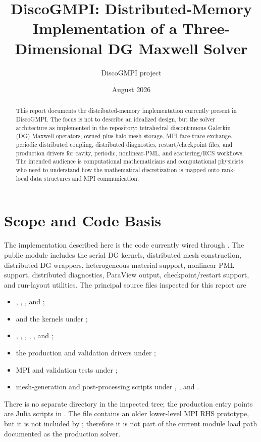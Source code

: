 \documentclass[11pt]{article}
\title{DiscoGMPI: Distributed-Memory Implementation of a Three-Dimensional DG Maxwell Solver}
\author{DiscoGMPI project}
\date{August 2026}
\begin{document}
\maketitle

\begin{abstract}
This report documents the distributed-memory implementation currently present
in DiscoGMPI.  The focus is not to describe an idealized design, but the
solver architecture as implemented in the repository: tetrahedral
discontinuous Galerkin (DG) Maxwell operators, owned-plus-halo mesh storage,
MPI face-trace exchange, periodic distributed coupling, distributed
diagnostics, restart/checkpoint files, and production drivers for cavity,
periodic, nonlinear-PML, and scattering/RCS workflows.  The intended audience
is computational mathematicians and computational physicists who need to
understand how the mathematical discretization is mapped onto rank-local data
structures and MPI communication.
\end{abstract}

\tableofcontents

\section{Scope and Code Basis}

The implementation described here is the code currently wired through
.  The public module includes the serial DG kernels,
distributed mesh construction, distributed DG wrappers, heterogeneous
material support, nonlinear PML support, distributed diagnostics, ParaView
output, checkpoint/restart support, and run-layout utilities.  The principal
source files inspected for this report are
\begin{itemize}
  \item {},
        ,
        ,
        and ;
  \item {} and the kernels under
        ;
  \item {}, ,
        , ,
        , and ;
  \item the production and validation drivers under ;
  \item MPI and validation tests under ;
  \item mesh-generation and post-processing scripts under
        , , and
        .
\end{itemize}
There is no separate  directory in the inspected tree; the
production entry points are Julia scripts in .  The file
 contains an older lower-level MPI RHS prototype, but it is
not included by ; therefore it is not part of the
current module load path documented as the production solver.
\end{document}
